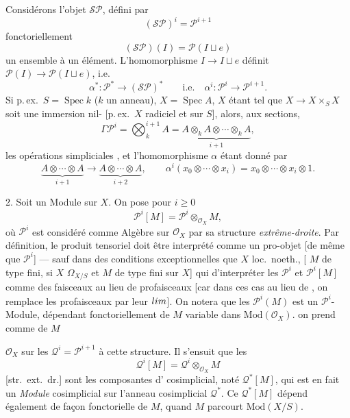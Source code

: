 \documentclass[11pt,a4paper]{article}
\begin{document}
Considérons l'objet  $\mathcal{SP}$, défini par
\[
  (\mathcal{SP})^{i} = \mathcal{P}^{i+1}
\]
\ill{} fonctoriellement \ill{}
\[
  (\mathcal{SP})(I) = \mathcal{P}(I \sqcup e)
\]
\ill{} un ensemble \ill{} à un élément. L'homomorphisme 
$I \to I \sqcup e$ définit $\mathcal{P}(I) \to \mathcal{P}(I \sqcup e)$,
i.e.
\[
  \alpha^{*} : \mathcal{P}^{*} \to (\mathcal{SP})^{*}
  \qquad \text{i.e.}\quad \alpha^{i} : \mathcal{P}^{i} \to \mathcal{P}^{i+1} .
\]
Si p.\,ex.\ $S = \operatorname{Spec} k$ ($k$ un anneau), $X = \operatorname{Spec} A$,
$X$ étant tel que $X \to X \times_S X$ soit une immersion nil-\ill{}
[p.\,ex.\ $X$ radiciel et \ill{} sur $S$], alors, \ill{} aux sections,
\[
  \Gamma \mathcal{P}^{i} = \bigotimes_{k}^{i+1} A
  = \underbrace{A \otimes_k A \otimes \cdots \otimes_k A}_{i+1},
\]
les opérations simpliciales \ill{} \ill{} \ill{}, et l'homomorphisme $\alpha$
étant donné par
\[
  \underbrace{A \otimes \cdots \otimes A}_{i+1}
  \longrightarrow
  \underbrace{A \otimes \cdots \otimes A}_{i+2},
  \qquad
  \alpha^{i}(x_0 \otimes \cdots \otimes x_i) = x_0 \otimes \cdots \otimes x_i \otimes 1 .
\]


2. Soit  un Module sur $X$.  \ill{}
On pose pour $i \geq 0$
\[
  \mathcal{P}^{i}[M] = \mathcal{P}^{i} \otimes_{\mathcal{O}_X} M ,
\]
où $\mathcal{P}^{i}$ est considéré comme Algèbre sur $\mathcal{O}_X$ par sa
structure \emph{extrême-droite}. 
Par définition, le produit tensoriel doit être interprété comme un
pro-objet [de même que $\mathcal{P}^{i}$] --- sauf dans des conditions
exceptionnelles \ill{} que \ill{} \ill{} $X$ loc.\ noeth.,
\ill{} [\ill{} $M$  de type fini, si $X$ \ill{}
$\Omega_{X/S}$ et $M$ de type fini sur $X$] qui \ill{} \ill{} \ill{}
d'interpréter les $\mathcal{P}^{i}$ et $\mathcal{P}^{i}[M]$ comme des
faisceaux au lieu de profaisceaux [car dans ces cas au lieu de
\ill{}, on remplace les profaisceaux \ill{} par leur \struck{\ill{}}
$\varprojlim$]. On notera que les $\mathcal{P}^{i}(M)$ est un
$\mathcal{P}^{i}$-Module, dépendant fonctoriellement de $M$ variable dans
$\mathrm{Mod}(\mathcal{O}_X)$. \ill{} on prend comme \ill{} de $M$ \ill{}


\ill{} $\mathcal{O}_X$ sur les $\mathcal{Q}^{i} = \mathcal{P}^{i+1}$
\ill{} \ill{} à cette structure. Il s'ensuit que les
\[
  \mathcal{Q}^{i}[M] = \mathcal{Q}^{i} \otimes_{\mathcal{O}_X} M
\]
[str.\ ext.\ dr.]
sont les composantes d'\ill{} \struck{\ill{}} cosimplicial, noté
$\mathcal{Q}^{*}[M]$, \ill{} \ill{} qui est en fait un \emph{Module}
cosimplicial sur l'anneau cosimplicial $\mathcal{Q}^{*}$. Ce
$\mathcal{Q}^{*}[M]$ dépend également de façon fonctorielle de $M$, quand
$M$ parcourt $\mathrm{Mod}(X/S)$.
\end{document}

